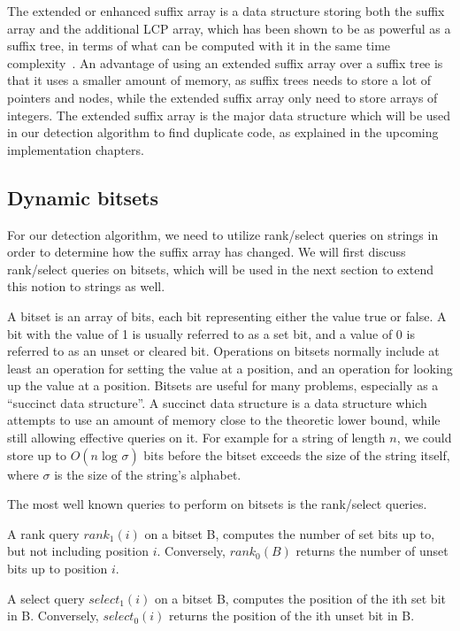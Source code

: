 The extended or enhanced suffix array is a data structure storing both the suffix array
and the additional LCP array, which has been shown to be as powerful as a suffix tree, in
terms of what can be computed with it in the same time
complexity~\cite{ReplaceSuffixTreeWithEnchancedSuffixArray}. An advantage of using an
extended suffix array over a suffix tree is that it uses a smaller amount of memory, as
suffix trees needs to store a lot of pointers and nodes, while the extended suffix array
only need to store arrays of integers. The extended suffix array is the major data
structure which will be used in our detection algorithm to find duplicate code, as
explained in the upcoming implementation chapters.



\subsection*{Dynamic bitsets}

For our detection algorithm, we need to utilize rank/select queries on strings in order to
determine how the suffix array has changed. We will first discuss rank/select queries on
bitsets, which will be used in the next section to extend this notion to strings as well.

A bitset is an array of bits, each bit representing either the value true or false. A bit
with the value of 1 is usually referred to as a set bit, and a value of 0 is referred to
as an unset or cleared bit. Operations on bitsets normally include at least an operation
for setting the value at a position, and an operation for looking up the value at a
position. Bitsets are useful for many problems, especially as a ``succinct data
structure''. A succinct data structure is a data structure which attempts to use an amount
of memory close to the theoretic lower bound, while still allowing effective queries on
it. For example for a string of length $n$, we could store up to $O(n \log_{}\sigma)$ bits
before the bitset exceeds the size of the string itself, where $\sigma$ is the size of the
string's alphabet.

The most well known queries to perform on bitsets is the rank/select queries.

\begin{definition}

    A rank query $rank_1(i)$ on a bitset B, computes the number of set bits up to, but not
    including position $i$. Conversely, $rank_0(B)$ returns the number of unset bits up to
    position $i$.

\end{definition}
\begin{definition}
    
    A select query $select_1(i)$ on a bitset B, computes the position of the ith set bit
    in B. Conversely, $select_0(i)$ returns the position of the ith unset bit in B.

\end{definition}

